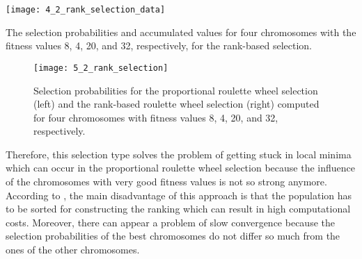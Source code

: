 \begin{table}[htp] \centering
	\centering
	\texttt{[image: 4\_2\_rank\_selection\_data]}
	\caption{The selection probabilities and accumulated values for four chromosomes with the fitness values 8, 4, 20, and 32, respectively, for the rank-based selection.}
	\label{5_2_rank_selection_data}
\end{table}

\begin{figure}[htp] \centering
	\centering
	\texttt{[image: 5\_2\_rank\_selection]}
	\caption{Selection probabilities for the proportional roulette wheel selection (left) and the rank-based roulette wheel selection (right) computed for four chromosomes with fitness values 8, 4, 20, and 32, respectively.}
	\label{5_2_rank_selection}
\end{figure}

Therefore, this selection type solves the problem of getting stuck in local minima which can occur in the proportional roulette wheel selection because the influence of the chromosomes with very good fitness values is not so strong anymore. According to \citeauthor{razali2011genetic} \cite{razali2011genetic}, the main disadvantage of this approach is that the population has to be sorted for constructing the ranking which can result in high computational costs. Moreover, there can appear a problem of slow convergence because the selection probabilities of the best chromosomes do not differ so much from the ones of the other chromosomes.\par  


